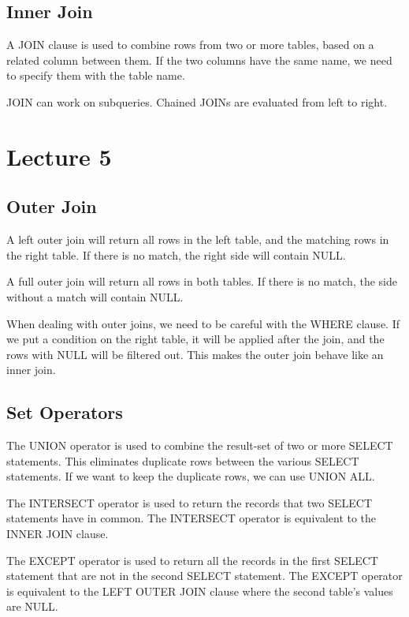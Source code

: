 \documentclass[a4paper,12pt]{article}
\begin{document}
\subsection{Inner Join}

A JOIN clause is used to combine rows from two or more tables, based on a related column between them.
If the two columns have the same name, we need to specify them with the table name.

JOIN can work on subqueries.
Chained JOINs are evaluated from left to right.

\section{Lecture 5}

\subsection{Outer Join}

A left outer join will return all rows in the left table, and the matching rows in the right table.
If there is no match, the right side will contain NULL.

A full outer join will return all rows in both tables.
If there is no match, the side without a match will contain NULL.

When dealing with outer joins, we need to be careful with the WHERE clause.
If we put a condition on the right table, it will be applied after the join, and the rows with NULL will be filtered out.
This makes the outer join behave like an inner join.

\subsection{Set Operators}

The UNION operator is used to combine the result-set of two or more SELECT statements.
This eliminates duplicate rows between the various SELECT statements.
If we want to keep the duplicate rows, we can use UNION ALL.

The INTERSECT operator is used to return the records that two SELECT statements have in common.
The INTERSECT operator is equivalent to the INNER JOIN clause.

The EXCEPT operator is used to return all the records in the first SELECT statement that are not in the second SELECT statement.
The EXCEPT operator is equivalent to the LEFT OUTER JOIN clause where the second table's values are NULL.
\end{document}
